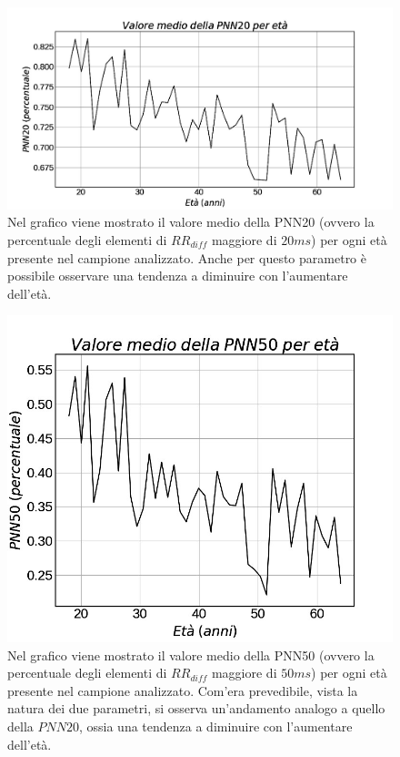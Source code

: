 \documentclass[12pt,a4paper, twoside, openright]{report}
\begin{document}
\begin{figure}[h!]
	\centering
	\includegraphics[width=\textwidth]{PNN20-age.jpg}
	\caption{Nel grafico viene mostrato il valore medio della PNN20 (ovvero la 					percentuale degli elementi di $RR_{diff}$ maggiore di $20ms$) per ogni età presente 	nel campione analizzato.
	Anche per questo parametro è possibile osservare una tendenza a diminuire con 				l'aumentare dell'età.}
	\label{fig:PNN20-age}
\end{figure}

\begin{figure}[h!]
	\centering
	\includegraphics[width=\textwidth]{PNN50-age.jpg}
	\caption{Nel grafico viene mostrato il valore medio della PNN50 (ovvero la 					percentuale degli elementi di $RR_{diff}$ maggiore di $50ms$) per ogni età presente 	nel campione analizzato.
	Com'era prevedibile, vista la natura dei due parametri, si osserva un'andamento 			analogo a quello della $PNN20$, ossia una tendenza a diminuire con l'aumentare 				dell'età.}
	\label{fig:PNN50-age}
\end{figure}
\end{document}
